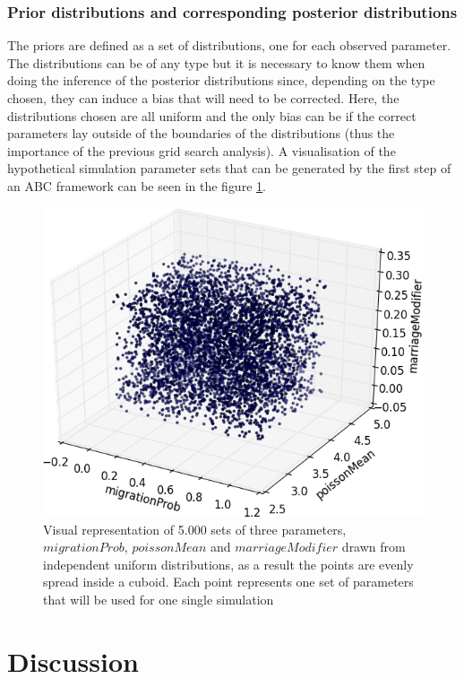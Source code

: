 \documentclass[a4paper,12pt]{report}
\begin{document}
\subsection{Prior distributions and corresponding posterior distributions}
The priors are defined as a set of distributions, one for each observed parameter. The distributions can be of any type but it is necessary to know them when doing the inference of the posterior distributions since, depending on the type chosen, they can induce a bias that will need to be corrected. Here, the distributions chosen are all uniform and the only bias can be if the correct parameters lay outside of the boundaries of the distributions (thus the importance of the previous grid search analysis). A visualisation of the hypothetical simulation parameter sets that can be generated by the first step of an ABC framework can be seen in the figure \ref{abc-space}.

\begin{figure}[!ht]
	\centering
	\includegraphics[width=1\textwidth]{../data/abc-space.png}
	\caption{Visual representation of 5.000 sets of three parameters, $migrationProb$, $poissonMean$ and $marriageModifier$ drawn from independent uniform distributions, as a result the points are evenly spread inside a cuboid. Each point represents one set of parameters that will be used for one single simulation}
	\label{abc-space}
\end{figure}



\chapter{Discussion}
\end{document}
